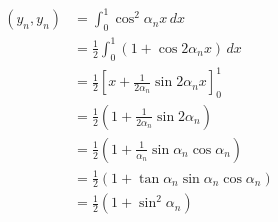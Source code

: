 \documentclass{article}
\begin{document}
\setcounter{subsubsection}{4}
\subsubsection{}

\begin{align*}
  (y_n, y_n) & = \int_0^1 \cos^2 \alpha_n x \,d x                                              \\
             & = \frac{1}{2} \int_0^1 (1 + \cos 2 \alpha_n x) \,d x                            \\
             & = \frac{1}{2} \left[ x + \frac{1}{2 \alpha_n} \sin 2 \alpha_n x \right]_0^1     \\
             & = \frac{1}{2} \left( 1 + \frac{1}{2 \alpha_n} \sin 2 \alpha_n \right)           \\
             & = \frac{1}{2} \left( 1 + \frac{1}{\alpha_n} \sin \alpha_n \cos \alpha_n \right) \\
             & = \frac{1}{2} \left( 1 + \tan \alpha_n \sin \alpha_n \cos \alpha_n \right)      \\
             & = \frac{1}{2} (1 + \sin^2 \alpha_n)
\end{align*}

\setcounter{subsubsection}{6}
\subsubsection{}
\end{document}
